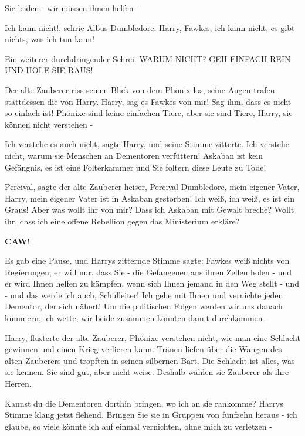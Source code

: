 \glqq{}Sie leiden - wir müssen ihnen helfen -\grqq{}

\glqq{}Ich kann nicht!\grqq{}, schrie Albus Dumbledore. \glqq{}Harry, Fawkes, ich
kann nicht, es gibt nichts, was ich tun kann!\grqq{}

Ein weiterer durchdringender Schrei. \glqq{}WARUM NICHT? GEH EINFACH REIN UND
HOLE SIE RAUS!\grqq{}

Der alte Zauberer riss seinen Blick von dem Phönix los, seine Augen trafen
stattdessen die von Harry. \glqq{}Harry, sag es Fawkes von mir! Sag ihm, dass es
nicht so einfach ist! Phönixe sind keine einfachen Tiere, aber sie sind Tiere,
Harry, sie können nicht verstehen -\grqq{}

\glqq{}Ich verstehe es auch nicht\grqq{}, sagte Harry, und seine Stimme zitterte.
\glqq{}Ich verstehe nicht, warum sie Menschen an Dementoren verfüttern! Askaban
ist kein Gefängnis, es ist eine Folterkammer und Sie foltern diese Leute zu
Tode!\grqq{}

\glqq{}Percival\grqq{}, sagte der alte Zauberer heiser, \glqq{}Percival
Dumbledore, mein eigener Vater, Harry, mein eigener Vater ist in Askaban
gestorben! Ich weiß, ich weiß, es ist ein Graus! Aber was wollt ihr von mir?
Dass ich Askaban mit Gewalt breche? Wollt ihr, dass ich eine offene Rebellion
gegen das Ministerium erkläre?\grqq{}

\textbf{CAW}!

Es gab eine Pause, und Harrys zitternde Stimme sagte: \glqq{}Fawkes weiß nichts
von Regierungen, er will nur, dass Sie - die Gefangenen aus ihren Zellen holen -
und er wird Ihnen helfen zu kämpfen, wenn sich Ihnen jemand in den Weg stellt -
und - und das werde ich auch, Schulleiter! Ich gehe mit Ihnen und vernichte
jeden Dementor, der sich nähert! Um die politischen Folgen werden wir uns danach
kümmern, ich wette, wir beide zusammen könnten damit durchkommen -\grqq{}

\glqq{}Harry\grqq{}, flüsterte der alte Zauberer, \glqq{}Phönixe verstehen nicht,
wie man eine Schlacht gewinnen und einen Krieg verlieren kann.\grqq{} Tränen
liefen über die Wangen des alten Zauberers und tropften in seinen silbernen
Bart. \glqq{}Die Schlacht ist alles, was sie kennen. Sie sind gut, aber nicht
weise. Deshalb wählen sie Zauberer als ihre Herren.\grqq{}

\glqq{}Kannst du die Dementoren dorthin bringen, wo ich an sie rankomme?\grqq{}
Harrys Stimme klang jetzt flehend. \glqq{}Bringen Sie sie in Gruppen von fünfzehn
heraus - ich glaube, so viele könnte ich auf einmal vernichten, ohne mich zu
verletzen -\grqq{}

